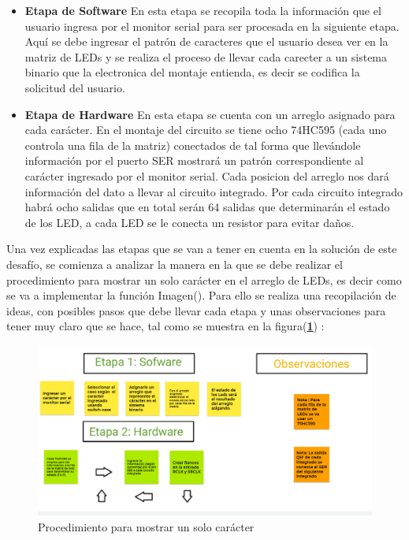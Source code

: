 \documentclass{article}
\begin{document}
\begin{itemize}
    \item \textbf{Etapa de Software}\label{sw}
    En esta etapa se recopila toda la información que el usuario ingresa por el monitor serial para ser procesada en la siguiente etapa. Aquí se debe ingresar el patrón de caracteres que el usuario desea ver en la matriz de LEDs y se realiza el proceso de llevar cada carecter a un sistema binario que la electronica del montaje entienda, es decir se codifica la solicitud del usuario.

    \item \textbf{Etapa de Hardware}\label{hw}
    En esta etapa se cuenta con un arreglo asignado para cada carácter. En el montaje del circuito se tiene ocho 74HC595 (cada uno controla una fila de la matriz) conectados de tal forma que llevándole información por el puerto SER mostrará un patrón correspondiente al carácter ingresado por el monitor serial. Cada posicion del arreglo nos dará información del dato a llevar al circuito integrado. Por cada circuito integrado habrá ocho salidas que en total serán 64 salidas que determinarán el estado de los LED, a cada LED se le conecta un resistor para evitar daños. 

\end{itemize}
Una vez explicadas las etapas que se van a tener en cuenta en la solución de este desafío, se comienza a analizar la manera en la que se debe realizar el procedimiento para mostrar un solo carácter en el arreglo de LEDs, es decir como se va a implementar la función Imagen(). Para ello se realiza una recopilación de ideas, con posibles pasos que debe llevar cada etapa y unas observaciones para tener muy claro que se hace, tal como se muestra en la figura(\textbf{\ref{f1}}) :

    \begin{figure}[h]
    \includegraphics[width=12cm]{funimagen.png}
    \centering
    \caption{Procedimiento para mostrar un solo carácter}
    \label{f1}
    \end{figure}
\end{document}

